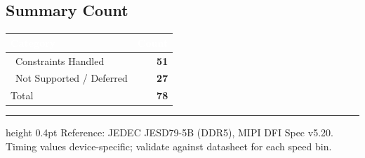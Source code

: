 \documentclass[11pt,a4paper]{article}
\newcommand{\THead}[1]{\cellcolor{navy}\textcolor{white}{\small\textbf{#1}}}
\newcommand{\RA}{\rowcolor{lgray}}
\newcommand{\RB}{\rowcolor{sky!30}}
\newcommand{\cmark}{\textcolor{grn}{\ding{51}}}
\newcommand{\xmark}{\textcolor{red}{\ding{55}}}
\begin{document}
\subsection{Summary Count}

\begin{center}
\begin{tabularx}{0.55\linewidth}{@{} l r @{}}
\toprule
\THead{Category} & \THead{Count} \\
\midrule
\RA \cmark\ Constraints Handled & \textbf{51} \\
\RB \xmark\ Not Supported / Deferred & \textbf{27} \\
\RA Total & \textbf{78} \\
\bottomrule
\end{tabularx}
\end{center}

\vspace{8pt}\hrule height 0.4pt\vspace{3pt}
{\scriptsize\color{dkgray}
Reference: JEDEC JESD79-5B (DDR5), MIPI DFI Spec v5.20.
Timing values device-specific; validate against datasheet for each speed bin.}
\end{document}
